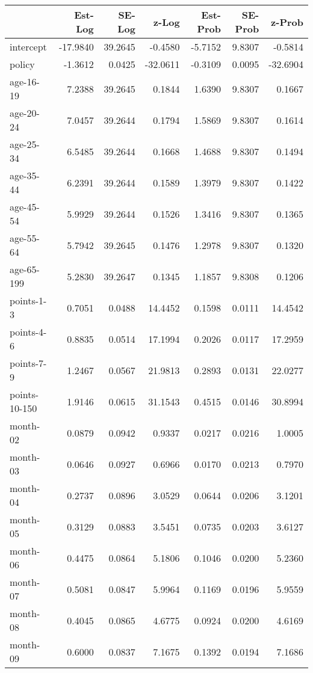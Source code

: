 \documentclass[10pt]{article}
\begin{document}
\begin{table}[ht]
\centering
\begin{tabular}{lrrrrrr}
  \hline
 & Est-Log & SE-Log & z-Log & Est-Prob & SE-Prob & z-Prob \\ 
  \hline
intercept & -17.9840 & 39.2645 & -0.4580 & -5.7152 & 9.8307 & -0.5814 \\ 
  policy & -1.3612 & 0.0425 & -32.0611 & -0.3109 & 0.0095 & -32.6904 \\ 
  age-16-19 & 7.2388 & 39.2645 & 0.1844 & 1.6390 & 9.8307 & 0.1667 \\ 
  age-20-24 & 7.0457 & 39.2644 & 0.1794 & 1.5869 & 9.8307 & 0.1614 \\ 
  age-25-34 & 6.5485 & 39.2644 & 0.1668 & 1.4688 & 9.8307 & 0.1494 \\ 
  age-35-44 & 6.2391 & 39.2644 & 0.1589 & 1.3979 & 9.8307 & 0.1422 \\ 
  age-45-54 & 5.9929 & 39.2644 & 0.1526 & 1.3416 & 9.8307 & 0.1365 \\ 
  age-55-64 & 5.7942 & 39.2645 & 0.1476 & 1.2978 & 9.8307 & 0.1320 \\ 
  age-65-199 & 5.2830 & 39.2647 & 0.1345 & 1.1857 & 9.8308 & 0.1206 \\ 
  points-1-3 & 0.7051 & 0.0488 & 14.4452 & 0.1598 & 0.0111 & 14.4542 \\ 
  points-4-6 & 0.8835 & 0.0514 & 17.1994 & 0.2026 & 0.0117 & 17.2959 \\ 
  points-7-9 & 1.2467 & 0.0567 & 21.9813 & 0.2893 & 0.0131 & 22.0277 \\ 
  points-10-150 & 1.9146 & 0.0615 & 31.1543 & 0.4515 & 0.0146 & 30.8994 \\ 
  month-02 & 0.0879 & 0.0942 & 0.9337 & 0.0217 & 0.0216 & 1.0005 \\ 
  month-03 & 0.0646 & 0.0927 & 0.6966 & 0.0170 & 0.0213 & 0.7970 \\ 
  month-04 & 0.2737 & 0.0896 & 3.0529 & 0.0644 & 0.0206 & 3.1201 \\ 
  month-05 & 0.3129 & 0.0883 & 3.5451 & 0.0735 & 0.0203 & 3.6127 \\ 
  month-06 & 0.4475 & 0.0864 & 5.1806 & 0.1046 & 0.0200 & 5.2360 \\ 
  month-07 & 0.5081 & 0.0847 & 5.9964 & 0.1169 & 0.0196 & 5.9559 \\ 
  month-08 & 0.4045 & 0.0865 & 4.6775 & 0.0924 & 0.0200 & 4.6169 \\ 
  month-09 & 0.6000 & 0.0837 & 7.1675 & 0.1392 & 0.0194 & 7.1686 \\ 

\end{tabular}
\end{table}
\end{document}
